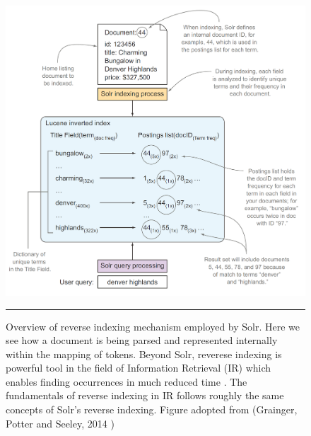 \begin{figure}[htbp]
    \includegraphics[width=6in]{Figures/solr_reverse_indexing.png}
    \rule{35em}{0.5pt}
  \caption[The key data structure supporting information retrieval is the inverted index within Solr system.]{Overview of reverse indexing mechanism employed by Solr. Here we see how a document is being parsed and represented internally within the mapping of tokens. Beyond Solr, reverese indexing is powerful tool in the field of Information Retrieval (IR) which enables finding occurrences in much reduced time \citep{manning2008introduction}. The fundamentals of reverse indexing in IR follows roughly the same concepts of Solr's reverse indexing. Figure adopted from (Grainger, Potter and Seeley, 2014 \citep{grainger2014solr})}
  \label{fig:SolrReverseIndexing}
\end{figure}


